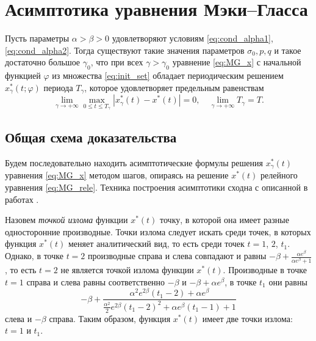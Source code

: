 \section{Асимптотика уравнения Мэки--Гласса}


\begin{theorem}
    \label{thm:existence}
Пусть параметры $\alpha > \beta > 0$ удовлетворяют условиям \eqref{eq:cond_alpha1}, \eqref{eq:cond_alpha2}. Тогда существуют такие значения параметров $\sigma_0, p, q$ и такое достаточно большое $\gamma_0$, что при всех $\gamma > \gamma_0$ уравнение \eqref{eq:MG_x} с начальной функцией $\varphi$ из множества \eqref{eq:init_set} обладает периодическим решением $x^*_\gamma(t; \varphi)$ периода $T_\gamma$, которое удовлетворяет предельным равенствам 
\begin{equation}
\label{eq:lim_x*}
	\lim_{\gamma\to+\infty}\max_{0\leqslant t\leqslant T_\gamma}|x_{\gamma}^*(t)-x^*(t)|=0,\quad \lim_{\gamma\to+\infty}T_{\gamma} = T.
\end{equation}
\end{theorem}

\subsection{Общая схема доказательства}
Будем последовательно находить асимптотические формулы решения $x_{\gamma}^*(t)$ уравнения \eqref{eq:MG_x} методом шагов, опираясь на решение $x^*(t)$ релейного уравнения \eqref{eq:MG_rele}. Техника построения асимптотики сходна с описанной в работах \cite{Kolesov2010, Glyzin2013}.

Назовем \textit{точкой излома} функции $x^*(t)$ точку, в которой она имеет разные односторонние производные. Точки излома следует искать среди точек, в которых функция $x^*(t)$ меняет аналитический вид, то есть среди точек $t = 1$, $2$, $t_1$. Однако, в точке $t = 2$ производные справа и слева совпадают и равны $-\beta+\frac{\alpha e^{\beta}}{\alpha e^{\beta}+1}$, то есть $t = 2$ не является точкой излома функции $x^*(t)$. Производные в точке $t = 1$ справа и слева равны соответственно $-\beta$ и $-\beta + \alpha e^\beta$, в точке $t_1$ они равны $$-\beta+\frac{\alpha^2e^{2\beta}(t_1-2)+\alpha e^\beta}{\frac{\alpha^2}{2}e^{2\beta}(t_1-2)^2+\alpha e^{\beta}(t_1-1)+1}$$ слева и $-\beta$ справа. 
Таким образом, функция $x^*(t)$ имеет две точки излома: $t = 1$ и $t_1$.


